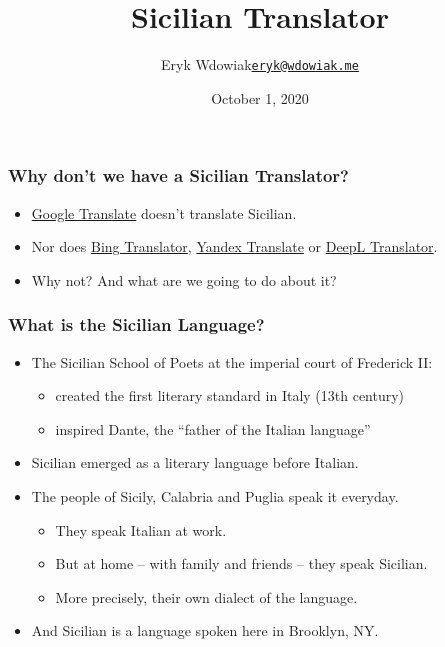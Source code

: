 \documentclass{beamer}
\title{Sicilian Translator}
\author{\texorpdfstring{Eryk Wdowiak\newline\href{eryk@wdowiak.me}{\texttt{eryk@wdowiak.me}}}{Eryk Wdowiak}}
\institute{Project Napizia}
\date{October 1, 2020}
\begin{document}

\begin{frame}
  \titlepage
\end{frame}


\begin{frame}
  \frametitle{Why don't we have a Sicilian Translator?}
  \begin{itemize}
  \item \href{https://translate.google.com/}{Google Translate} doesn't translate Sicilian.
  \item Nor does \href{https://www.bing.com/translator/}{Bing Translator},
    \href{https://translate.yandex.com/}{Yandex Translate} or
    \href{https://www.deepl.com/translator}{DeepL Translator}.
  \vspace{1em}
  \item Why not?  And what are we going to do about it?
  \end{itemize} 
\end{frame}


\begin{frame}
  \frametitle{What is the Sicilian Language?}
  \begin{itemize}
  \item The Sicilian School of Poets at the imperial court of Frederick II:
    \begin{itemize}
    \item created the first literary standard in Italy (13th century)
    \item inspired Dante, the ``father of the Italian language''
    \end{itemize}
  \vspace{1em}
  \item Sicilian emerged as a literary language before Italian.
  \vspace{1em}
  \item The people of Sicily, Calabria and Puglia speak it everyday.
    \begin{itemize}
    \item They speak Italian at work.
    \item But at home -- with family and friends -- they speak Sicilian.
    \item More precisely, their own dialect of the language.
    \end{itemize}
  \vspace{1em}
  \item And Sicilian is a language spoken here in Brooklyn, NY.
  \end{itemize} 
\end{frame}
\end{document}
